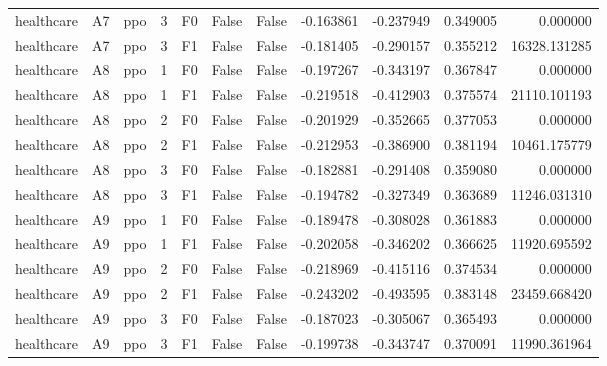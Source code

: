 \begin{tabular}{lllrlllrrrr}
healthcare &      A7 &       ppo &     3 &  F0 &           False &            False & -0.163861 & -0.237949 & 0.349005 &         0.000000 \\
healthcare &      A7 &       ppo &     3 &  F1 &           False &            False & -0.181405 & -0.290157 & 0.355212 &     16328.131285 \\
healthcare &      A8 &       ppo &     1 &  F0 &           False &            False & -0.197267 & -0.343197 & 0.367847 &         0.000000 \\
healthcare &      A8 &       ppo &     1 &  F1 &           False &            False & -0.219518 & -0.412903 & 0.375574 &     21110.101193 \\
healthcare &      A8 &       ppo &     2 &  F0 &           False &            False & -0.201929 & -0.352665 & 0.377053 &         0.000000 \\
healthcare &      A8 &       ppo &     2 &  F1 &           False &            False & -0.212953 & -0.386900 & 0.381194 &     10461.175779 \\
healthcare &      A8 &       ppo &     3 &  F0 &           False &            False & -0.182881 & -0.291408 & 0.359080 &         0.000000 \\
healthcare &      A8 &       ppo &     3 &  F1 &           False &            False & -0.194782 & -0.327349 & 0.363689 &     11246.031310 \\
healthcare &      A9 &       ppo &     1 &  F0 &           False &            False & -0.189478 & -0.308028 & 0.361883 &         0.000000 \\
healthcare &      A9 &       ppo &     1 &  F1 &           False &            False & -0.202058 & -0.346202 & 0.366625 &     11920.695592 \\
healthcare &      A9 &       ppo &     2 &  F0 &           False &            False & -0.218969 & -0.415116 & 0.374534 &         0.000000 \\
healthcare &      A9 &       ppo &     2 &  F1 &           False &            False & -0.243202 & -0.493595 & 0.383148 &     23459.668420 \\
healthcare &      A9 &       ppo &     3 &  F0 &           False &            False & -0.187023 & -0.305067 & 0.365493 &         0.000000 \\
healthcare &      A9 &       ppo &     3 &  F1 &           False &            False & -0.199738 & -0.343747 & 0.370091 &     11990.361964 \\
\bottomrule
\end{tabular}
